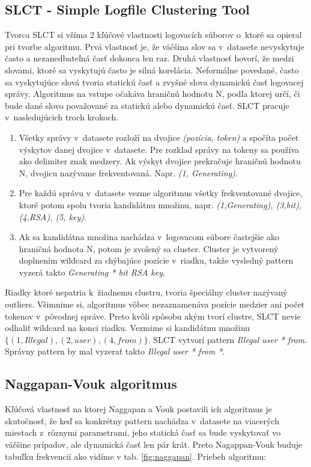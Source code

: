 \subsection{SLCT - Simple Logfile Clustering Tool}
Tvorca SLCT \parencite{slct, slctloghound} si všíma 2 kľúčové vlastnosti logovacích súborov o~ktoré sa opieral pri tvorbe algoritmu. Prvá vlastnosť je, že väčšina slov sa v~datasete nevyskytuje často a nezanedbateľná časť dokonca len raz. Druhá vlastnosť hovorí, že medzi slovami, ktoré sa vyskytujú často je silná korelácia. Neformálne povedané, často sa vyskytujúce slová tvoria statickú časť a zvyšné slova dynamickú časť logovacej správy. Algoritmus na vstupe očakáva hraničnú hodnotu N, podľa ktorej určí, či bude dané slovo považované za statickú alebo dynamickú časť.  SLCT pracuje v~nasledujúcich troch krokoch.

\begin{enumerate}
  \item Všetky správy v~datasete rozloží na dvojice \emph{(pozícia, token)} a spočíta počet výskytov danej dvojice v~datasete. Pre rozklad správy na tokeny sa používa ako delimiter znak medzery. Ak výskyt dvojice prekračuje hraničnú hodnotu N, dvojicu nazývame frekventovaná. Napr. \emph{(1, Generating)}.
  \item Pre každú správu v~datasete vezme algoritmus všetky frekventované dvojice, ktoré potom spolu tvoria kandidátnu množinu, napr. \emph{{(1,Generating), (3,bit), (4,RSA), (5, key)}}. 
  \item Ak sa kandidátna množina nachádza v~logovacom súbore častejšie ako hraničná hodnota N, potom je zvolený sa cluster. Cluster je vytvorený doplnením wildcard za chýbajúce pozície v~riadku, takže vysledný pattern vyzerá takto \emph{Generating * bit RSA key}.
\end{enumerate}

Riadky ktoré nepatria k~žiadnemu clustru, tvoria špeciálny cluster nazývaný outliers. Všimnime si, algoritmus vôbec nezaznamenáva pozície medzier ani počet tokenov v~pôvodnej správe. Preto kvôli spôsobu akým tvorí clustre, SLCT nevie odhaliť wildcard na konci riadku. Vezmime si kandidátnu množinu $\{(1,Illegal), (2,user), (4,from)\} $. SLCT vytvorí pattern \emph{Illegal user * from}. Správny pattern by mal vyzerať takto  \emph{Illegal user * from *}.

\subsection{Naggapan-Vouk algoritmus}
Kľúčová vlastnosť na ktorej Naggapan a Vouk postavili ich algoritmus \parencite{nagappanvouk} je skutočnosť, že keď sa konkrétny pattern nachádza v~datasete na viacerých miestach z~rôznymi parametrami, jeho statická časť sa bude vyskytovať vo väčšine prípadov, ale dynamická časť len pár krát. Preto Nagappan-Vouk buduje tabuľku frekvencií ako vidíme v tab. \ref{fig:naggapan}. Priebeh algoritmu:

